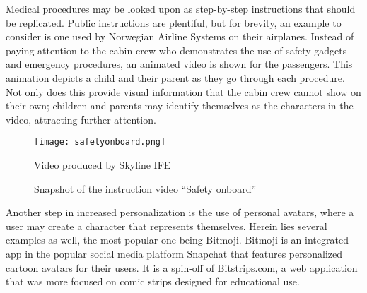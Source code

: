 Medical procedures may be looked upon as step-by-step instructions that should be replicated. Public instructions are plentiful, but for brevity, an example to consider is one used by Norwegian Airline Systems on their airplanes. Instead of paying attention to the cabin crew who demonstrates the use of safety gadgets and emergency procedures, an animated video \parencite{norwegianairshuttle2012} is shown for the passengers. This animation depicts a child and their parent as they go through each procedure. Not only does this provide visual information that the cabin crew cannot show on their own; children and parents may identify themselves as the characters in the video, attracting further attention.

\begin{figure}
    \centering
    \texttt{[image: safetyonboard.png]}
    \caption{Snapshot of the instruction video \enquote{Safety onboard}}
    Video produced by Skyline IFE
    \label{fig:safetyonboard}
\end{figure}

Another step in increased personalization is the use of personal avatars, where a user may create a character that represents themselves. Herein lies several examples as well, the most popular one being Bitmoji. Bitmoji is an integrated app in the popular social media platform Snapchat that features personalized cartoon avatars for their users. It is a spin-off of Bitstrips.com, a web application that was more focused on comic strips designed for educational use. %

